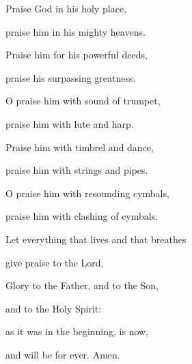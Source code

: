 \noindent Praise God in his holy place,~\GreStar{}~\nopagebreak

praise him in his mighty heavens.

\noindent Praise him for his powerful deeds,~\GreStar{}~\nopagebreak

praise his surpassing greatness.

\noindent O praise him with sound of trumpet,~\GreStar{}~\nopagebreak

praise him with lute and harp.

\noindent Praise him with timbrel and dance,~\GreStar{}~\nopagebreak

praise him with strings and pipes.

\noindent O praise him with resounding cymbals,~\GreStar{}~\nopagebreak

praise him with clashing of cymbals.

\noindent Let everything that lives and that breathes~\GreStar{}~\nopagebreak

give praise to the Lord.

\noindent Glory to the Father, and to the Son,~\GreStar{}~\nopagebreak

and to the Holy Spirit:

\noindent as it was in the beginning, is now,~\GreStar{}~\nopagebreak

and will be for ever. Amen.
